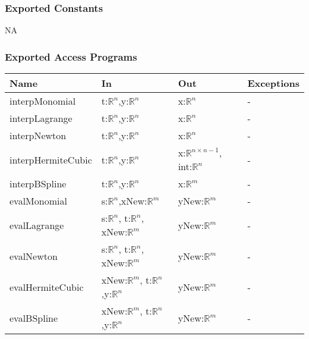 \documentclass[12pt, titlepage]{article}
\begin{document}
\subsubsection{Exported Constants}


NA

\subsubsection{Exported Access Programs}

\begin{center}
\begin{tabular}{p{4cm} p{4cm} p{6cm} p{1cm}}
\hline
\textbf{Name} & \textbf{In} & \textbf{Out} & \textbf{Exceptions} \\
\hline
interpMonomial & t:$\mathbb{R}^n$,y:$\mathbb{R}^n$  & x:$\mathbb{R}^n$ & - \\
interpLagrange & t:$\mathbb{R}^n$,y:$\mathbb{R}^n$ & x:$\mathbb{R}^n$ & - \\
interpNewton & t:$\mathbb{R}^n$,y:$\mathbb{R}^n$ & x:$\mathbb{R}^n$ & - \\
interpHermiteCubic & t:$\mathbb{R}^n$,y:$\mathbb{R}^n$ & x:$\mathbb{R}^{n 
\times n-1}$, int:$\mathbb{R}^{n}$ & 
- \\
interpBSpline & t:$\mathbb{R}^n$,y:$\mathbb{R}^n$ & x:$\mathbb{R}^{m}$ & - \\

evalMonomial & s:$\mathbb{R}^n$,xNew:$\mathbb{R}^m$  & 
yNew:$\mathbb{R}^m$  & - 
\\
evalLagrange & s:$\mathbb{R}^n$, t:$\mathbb{R}^n$, xNew:$\mathbb{R}^m$ & 
yNew:$\mathbb{R}^m$ & - \\
evalNewton & s:$\mathbb{R}^n$, t:$\mathbb{R}^n$, xNew:$\mathbb{R}^m$ & 
yNew:$\mathbb{R}^m$ & - \\
evalHermiteCubic &  xNew:$\mathbb{R}^m$, t:$\mathbb{R}^n$,y:$\mathbb{R}^n$ & 
yNew:$\mathbb{R}^m$ & - 
\\
evalBSpline & xNew:$\mathbb{R}^m$, t:$\mathbb{R}^n$,y:$\mathbb{R}^n$  
& yNew:$\mathbb{R}^m$ & - \\
\hline
\end{tabular}
\end{center}

\end{document}
